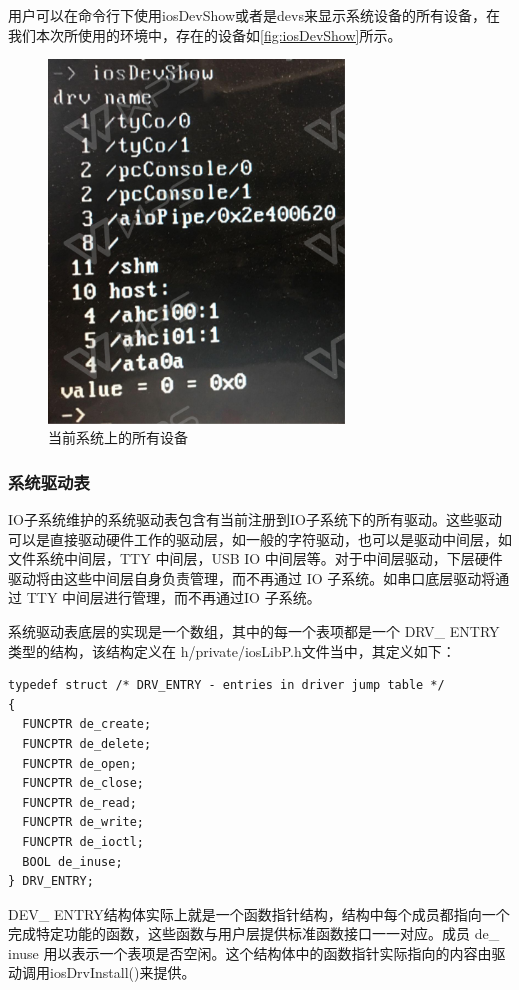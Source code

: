 用户可以在命令行下使用iosDevShow或者是devs来显示系统设备的所有设备，在我们本次所使用的环境中，存在的设备如\autoref{fig:iosDevShow}所示。
\begin{figure}[!h]
\centering
\includegraphics[width=0.7\textwidth ,height = 0.4\textwidth]{./graphics/iosDevShow.pdf}
\caption{当前系统上的所有设备}\label{fig:iosDevShow}
\end{figure}

\subsubsection{系统驱动表}
	IO子系统维护的系统驱动表包含有当前注册到IO子系统下的所有驱动。这些驱动可以是直接驱动硬件工作的驱动层，如一般的字符驱动，也可以是驱动中间层，如文件系统中间层，TTY 中间层，USB IO 中间层等。对于中间层驱动，下层硬件驱动将由这些中间层自身负责管理，而不再通过 IO 子系统。如串口底层驱动将通过 TTY 中间层进行管理，而不再通过IO 子系统。
	
	系统驱动表底层的实现是一个数组，其中的每一个表项都是一个 DRV\_ ENTRY 类型的结构，该结构定义在 h/private/iosLibP.h文件当中，其定义如下：
\lstset{language=C}
\begin{lstlisting}
typedef struct /* DRV_ENTRY - entries in driver jump table */ 
{ 
  FUNCPTR de_create; 
  FUNCPTR de_delete; 
  FUNCPTR de_open; 
  FUNCPTR de_close; 
  FUNCPTR de_read; 
  FUNCPTR de_write; 
  FUNCPTR de_ioctl; 
  BOOL de_inuse; 
} DRV_ENTRY; 
\end{lstlisting}
DEV\_ ENTRY结构体实际上就是一个函数指针结构，结构中每个成员都指向一个完成特定功能的函数，这些函数与用户层提供标准函数接口一一对应。成员 de\_ inuse 用以表示一个表项是否空闲。这个结构体中的函数指针实际指向的内容由驱动调用iosDrvInstall()来提供。 


